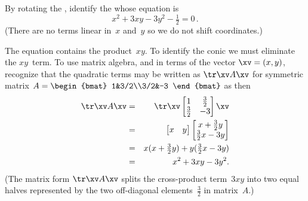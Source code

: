 \begin{example} \label{eg:csrc2}
By rotating the , identify the  whose equation is
\begin{equation*}
x^2+3xy-3y^2-\tfrac12=0\,.
\end{equation*}
(There are no terms linear in~\(x\) and~\(y\) so we do not shift coordinates.)
\begin{solution} 
The equation contains the product~\(xy\).
To identify the conic we must eliminate the \(xy\)~term.
To use matrix algebra, and in terms of the vector \(\xv=(x,y)\), recognize that the quadratic terms may be written as \(\tr\xv A\xv\) for symmetric matrix \(A=\begin{bmat} 1&3/2\\3/2&-3 \end{bmat}\) as then
\begin{eqnarray*}
\tr\xv A\xv
&=&\tr\xv\begin{bmatrix} 1&\frac32\\\frac32&-3 \end{bmatrix}\xv
\\&=&\begin{bmatrix} x&y \end{bmatrix}\begin{bmatrix} x+\frac32y\\\frac32x-3y \end{bmatrix}
\\&=&x(x+\tfrac32y)+y(\tfrac32x-3y)
\\&=&x^2+3xy-3y^2.
\end{eqnarray*}
(The matrix form \(\tr\xv A\xv\) splits the cross-product term~\(3xy\) into two equal halves represented by the two off-diagonal elements~\(\tfrac32\) in matrix~\(A\).)
\def\temp#1{\begin{tikzpicture}
  \begin{axis}[footnotesize,font=\footnotesize ,axis equal image
  , xlabel={$x$}, ylabel={$y$}, axis lines=middle
  , xtick={-1,1,2}, ytick={-2,-1,1,2}  ]
  \addplot[brown,quiver={u=1,v=-3},-stealth] coordinates {(-1/3,3/3)};
  \node[brown,right] at (axis cs:0.566,-1.7) {$x'$};
  \addplot[brown,quiver={u=0.316,v=-0.949},-stealth,thick] coordinates {(0,0)};
  \node[brown,right] at (axis cs:0.316,-0.949) {$\vec v_1$};
  \addplot[brown,quiver={u=3,v=1},-stealth] coordinates {(-3/3,-1/3)};
  \node[brown,above] at (axis cs:1.7,0.566) {$y'$};
  \addplot[brown,quiver={u=0.949,v=0.316},-stealth,thick] coordinates {(0,0)};
  \node[brown,above] at (axis cs:0.949,0.316) {$\vec v_2$};

\end{axis}
\end{tikzpicture}}
\end{solution}
\end{example}
